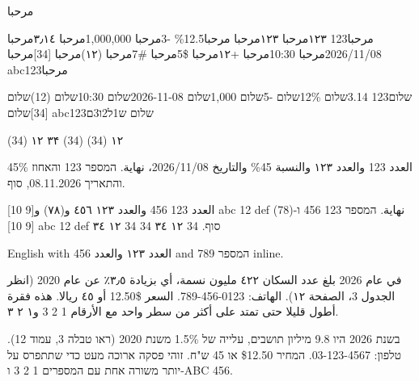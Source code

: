 \documentclass{article}
\begin{document}
\ar مرحبا

{\ar مرحبا123 ١٢٣مرحبا ۱۲۳مرحبا مرحبا12.5\% -3مرحبا 1,000,000مرحبا
٣٫١٤مرحبا 2026/11/08مرحبا 10:30مرحبا +١٢مرحبا \$5مرحبا \#7مرحبا
(١٢)مرحبا [34]مرحبا abc123مرحبا}

{\he שלום123 3.14שלום 12\%שלום -5שלום 1,000שלום 2026-11-08שלום 10:30שלום
(12)שלום [34]שלום abc123שלום ש1ל2ו3ם}

{ (34) ١٢ ۳۴} { (34)} { (34) ١٢}

{\ar العدد 123 والعدد ١٢٣ والنسبة 45\% والتاريخ 2026/11/08، نهاية.}
{\he המספר 123 והאחוז 45\% והתאריך 08.11.2026, סוף.}

{\ar العدد 123 456 والعدد ١٢٣ ٤٥٦ و(٧٨) و[9 10] abc 12 def نهاية.}
{\he המספר 123 456 ו-(78) [9 10] abc 12 def סוף.}
{ 34 ١٢ ٣٤} { 34} { 34 ١٢ ٣٤}

English with \textarabic{العدد ١٢٣ والعدد 456} and \texthebrew{המספר 789} inline.

\begin{Arabic}
في عام 2026 بلغ عدد السكان ٤٢٢ مليون نسمة، أي بزيادة ٣٫٥٪ عن عام 2020
(انظر الجدول 3، الصفحة ١٢). الهاتف: 0123-456-789. السعر \$12.50 أو ٤٥ ريالا.
هذه فقرة أطول قليلا حتى تمتد على أكثر من سطر واحد مع الأرقام 1 2 3 و١ ٢ ٣.
\end{Arabic}

\begin{hebrew}
בשנת 2026 היו 9.8 מיליון תושבים, עלייה של 1.5\% משנת 2020 (ראו טבלה 3,
עמוד 12). טלפון: 03-123-4567. המחיר \$12.50 או 45 ש"ח. זוהי פסקה ארוכה מעט
כדי שתתפרס על יותר משורה אחת עם המספרים 1 2 3 ו-ABC 456.
\end{hebrew}
\end{document}
